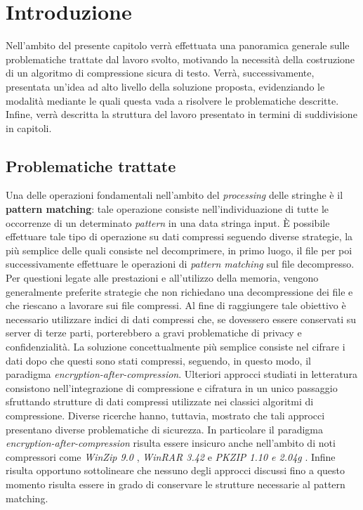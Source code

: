 \chapter{Introduzione}

\begin{citazione}
Nell'ambito del presente capitolo verrà effettuata una panoramica generale sulle problematiche trattate dal lavoro svolto, motivando la necessità della costruzione di un algoritmo di compressione sicura di testo. Verrà, successivamente, presentata un'idea ad alto livello della soluzione proposta, evidenziando le modalità mediante le quali questa vada a risolvere le problematiche descritte. Infine, verrà descritta la struttura del lavoro presentato in termini di suddivisione in capitoli. 
\end{citazione}
\newpage

\section{Problematiche trattate}
Una delle operazioni fondamentali nell'ambito del \emph{processing} delle stringhe è il \textbf{pattern matching}: tale operazione consiste nell'individuazione di tutte le occorrenze di un determinato \emph{pattern} in una data stringa input. È possibile effettuare tale tipo di operazione su dati compressi seguendo diverse strategie, la più semplice delle quali consiste nel decomprimere, in primo luogo, il file per poi successivamente effettuare le operazioni di \emph{pattern matching} sul file decompresso. Per questioni legate alle prestazioni e all'utilizzo della memoria, vengono generalmente preferite strategie che non richiedano una decompressione dei file e che riescano a lavorare sui file compressi. Al fine di raggiungere tale obiettivo è necessario utilizzare indici di dati compressi che, se dovessero essere conservati su server di terze parti, porterebbero a gravi problematiche di privacy e confidenzialità. La soluzione concettualmente più semplice consiste nel cifrare i dati dopo che questi sono stati compressi, seguendo, in questo modo, il paradigma \emph{encryption-after-compression}. Ulteriori approcci studiati in letteratura consistono nell'integrazione di compressione e cifratura in un unico passaggio sfruttando strutture di dati compressi utilizzate nei classici algoritmi di compressione. Diverse ricerche hanno, tuttavia, mostrato che tali approcci presentano diverse problematiche di sicurezza. In particolare il paradigma \emph{encryption-after-compression} risulta essere insicuro anche nell'ambito di noti compressori come \emph{WinZip 9.0} \cite{kohno2004attacking} \cite{phong2010password}, \emph{WinRAR 3.42} \cite{yeo2006security} e \emph{PKZIP 1.10 e 2.04g} \cite{stay2001zip} \cite{biham1994known}. Infine risulta opportuno sottolineare che nessuno degli approcci discussi fino a questo momento risulta essere in grado di conservare le strutture necessarie al pattern matching.
